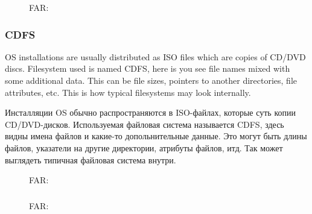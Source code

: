 \begin{figure}[H]
\centering
{}
\caption{FAR: }
\end{figure}

\clearpage
\subsubsection{\ac{CDFS}}

\ifdefined\ENGLISH
\ac{OS} installations are usually distributed as ISO files which are copies of CD/DVD discs.
Filesystem used is named \ac{CDFS}, here is you see file names mixed with some additional data.
This can be file sizes, pointers to another directories, file attributes, etc.
This is how typical filesystems may look internally.
\fi %

\ifdefined\RUSSIAN
Инсталляции \ac{OS} обычно распространяются в ISO-файлах, которые суть копии CD/DVD-дисков.
Используемая файловая система называется \ac{CDFS}, здесь видны имена файлов и какие-то допольнительные данные.
Это могут быть длины файлов, указатели на другие директории, атрибуты файлов, итд.
Так может выглядеть типичная файловая система внутри.
\fi %

\begin{figure}[H]
\centering
{}
\caption{FAR: }
\end{figure}

\clearpage
\subsubsection{}


\begin{figure}[H]
\centering
{}
\caption{FAR: }
\end{figure}


